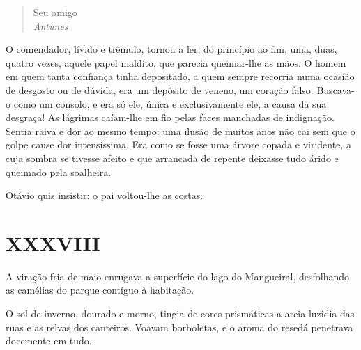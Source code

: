 {\begin{quote}
\begin{flushright}
Seu amigo\\
\emph{Antunes}
\end{flushright}
\end{quote}

O comendador, lívido e trêmulo, tornou a ler, do
princípio ao fim, uma, duas, quatro vezes, aquele papel maldito,
que parecia queimar-lhe as mãos. O homem em quem tanta confiança tinha
depositado, a quem sempre recorria numa ocasião de desgosto ou de
dúvida, era um depósito de veneno, um coração falso. Buscava-o como um
consolo, e era só ele, única e exclusivamente ele, a causa da
sua desgraça! As lágrimas caíam-lhe em fio pelas faces manchadas de
indignação. Sentia raiva e dor ao mesmo tempo: uma
ilusão de muitos anos não cai sem que o golpe cause
dor intensíssima. Era como se fosse uma árvore
copada e viridente, a cuja sombra se tivesse afeito e que arrancada de
repente deixasse tudo árido e queimado pela soalheira.



Otávio quis insistir: o pai voltou-lhe as costas.


\section{XXXVIII}


A viração fria de maio enrugava a superfície
do lago do Mangueiral, desfolhando as camélias do parque
contíguo à habitação.

O sol de inverno, dourado e morno, tingia de cores
prismáticas a areia luzidia das ruas e as relvas dos canteiros. Voavam
borboletas, e o aroma do resedá penetrava docemente em tudo.


}
